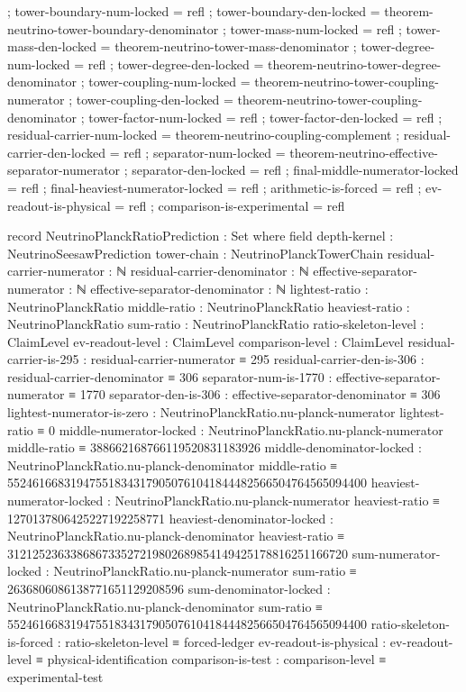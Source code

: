 \documentclass[11pt,a4paper]{book}
\begin{document}
\begin{code}
{  ; tower-boundary-num-locked     = refl
  ; tower-boundary-den-locked     = theorem-neutrino-tower-boundary-denominator
  ; tower-mass-num-locked         = refl
  ; tower-mass-den-locked         = theorem-neutrino-tower-mass-denominator
  ; tower-degree-num-locked       = refl
  ; tower-degree-den-locked       = theorem-neutrino-tower-degree-denominator
  ; tower-coupling-num-locked     = theorem-neutrino-tower-coupling-numerator
  ; tower-coupling-den-locked     = theorem-neutrino-tower-coupling-denominator
  ; tower-factor-num-locked       = refl
  ; tower-factor-den-locked       = refl
  ; residual-carrier-num-locked   = theorem-neutrino-coupling-complement
  ; residual-carrier-den-locked   = refl
  ; separator-num-locked          = theorem-neutrino-effective-separator-numerator
  ; separator-den-locked          = refl
  ; final-middle-numerator-locked = refl
  ; final-heaviest-numerator-locked = refl
  ; arithmetic-is-forced          = refl
  ; ev-readout-is-physical        = refl
  ; comparison-is-experimental    = refl }

record NeutrinoPlanckRatioPrediction : Set where
  field
    depth-kernel                 : NeutrinoSeesawPrediction
    tower-chain                  : NeutrinoPlanckTowerChain
    residual-carrier-numerator   : ℕ
    residual-carrier-denominator : ℕ
    effective-separator-numerator : ℕ
    effective-separator-denominator : ℕ
    lightest-ratio               : NeutrinoPlanckRatio
    middle-ratio                 : NeutrinoPlanckRatio
    heaviest-ratio               : NeutrinoPlanckRatio
    sum-ratio                    : NeutrinoPlanckRatio
    ratio-skeleton-level         : ClaimLevel
    ev-readout-level             : ClaimLevel
    comparison-level             : ClaimLevel
    residual-carrier-is-295      : residual-carrier-numerator ≡ 295
    residual-carrier-den-is-306  : residual-carrier-denominator ≡ 306
    separator-num-is-1770        : effective-separator-numerator ≡ 1770
    separator-den-is-306         : effective-separator-denominator ≡ 306
    lightest-numerator-is-zero   :
      NeutrinoPlanckRatio.nu-planck-numerator lightest-ratio ≡ 0
    middle-numerator-locked      :
      NeutrinoPlanckRatio.nu-planck-numerator middle-ratio
        ≡ 388662168766119520831183926
    middle-denominator-locked    :
      NeutrinoPlanckRatio.nu-planck-denominator middle-ratio
        ≡ 552461668319475518343179050761041844482566504764565094400
    heaviest-numerator-locked    :
      NeutrinoPlanckRatio.nu-planck-numerator heaviest-ratio
        ≡ 1270137806425227192258771
    heaviest-denominator-locked  :
      NeutrinoPlanckRatio.nu-planck-denominator heaviest-ratio
        ≡ 312125236338686733527219802689854149425178816251166720
    sum-numerator-locked         :
      NeutrinoPlanckRatio.nu-planck-numerator sum-ratio
        ≡ 2636806086138771651129208596
    sum-denominator-locked       :
      NeutrinoPlanckRatio.nu-planck-denominator sum-ratio
        ≡ 552461668319475518343179050761041844482566504764565094400
    ratio-skeleton-is-forced     : ratio-skeleton-level ≡ forced-ledger
    ev-readout-is-physical       : ev-readout-level ≡ physical-identification
    comparison-is-test           : comparison-level ≡ experimental-test


\end{code}
\end{document}
